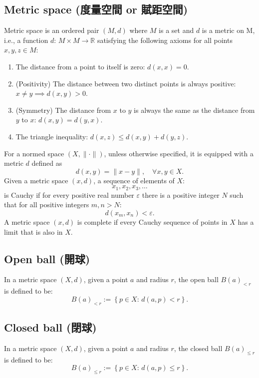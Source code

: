 \documentclass[a4paper,12pt]{article}
\begin{document}
\subsection{Metric space (度量空間 or 賦距空間)}
Metric space is an ordered pair $(M, d)$ where $M$ is a set and $d$ is a metric on M, i.e., a function $d:\,M\times M\to\mathbb{R}$ satisfying the following axioms for all points $x,y,z\in M$:
\begin{enumerate}
\item The distance from a point to itself is zero: $d(x,x)=0$.
\item (Positivity) The distance between two distinct points is always positive:$x\neq y\implies d(x,y)>0$.
\item (Symmetry) The distance from $x$ to $y$ is always the same as the distance from $y$ to $x$: $d(x,y)=d(y,x)$.
\item The triangle inequality: $d(x,z)\leq d(x,y)+d(y,z)$.
\end{enumerate}

For a normed space $(X,\|\cdot\|)$, unless otherwise specified, it is equipped with a metric $d$ defined as
\[d(x,y)=\|x-y\|,\quad \forall x,y\in X.\]
Given a metric space $(x,d)$, a sequence of elements of $X$:
\[x_1,x_2,x_3,\ldots\]
is Cauchy if for every positive real number $\varepsilon$ there is a positive integer $N$ such that for all positive integers $m,n>N$:
\[d\left(x_m,x_n\right)<\varepsilon.\]
A metric space $(x,d)$ is complete if every Cauchy sequence of points in $X$ has a limit that is also in $X$.
\subsection{Open ball (開球)}
In a metric space $(X,d)$, given a point $a$ and radius $r$, the open ball $B(a)_{<r}$ is defined to be:
\[B(a)_{<r}:=\left\{p\in X:\, d(a,p)<r\right\}.\]
\subsection{Closed ball (閉球)}
In a metric space $(X,d)$, given a point $a$ and radius $r$, the closed ball $B(a)_{\leq r}$ is defined to be:
\[B(a)_{\leq r}:=\left\{p\in X:\, d(a,p)\leq r\right\}.\]
\end{document}

